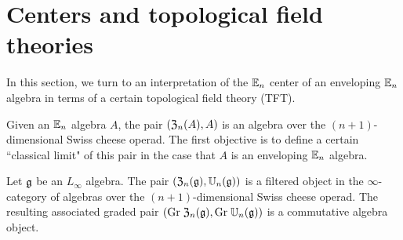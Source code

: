 \documentclass[11pt]{amsart}
\numberwithin{equation}{section}
\begin{document}
\section{Centers and topological field theories}
\label{sec: TFT}
%
%
%
%

In this section, we turn to an interpretation of the $\mathbb E_n$ center of an enveloping $\mathbb E_n$ algebra in terms of a certain topological field theory (TFT).

Given an $\mathbb E_n$ algebra $A$, the pair $(\mathfrak Z_n (A) , A)$ is an algebra over the $(n+1)$-dimensional Swiss cheese operad. 
The first objective is to define a certain ``classical limit" of this pair in the case that $A$ is an enveloping $\mathbb E_n$ algebra. 

\begin{prp}
\label{prp:swiss1}
Let $\mathfrak g$ be an $L_\infty$ algebra. 
The pair $(\mathfrak Z_n(\mathfrak g) , \mathbb U_n(\mathfrak g))$ is a filtered object in the $\infty$-category of algebras over the $(n+1)$-dimensional Swiss cheese operad. 
The resulting associated graded pair $({\rm Gr} \; \mathfrak Z_n(\mathfrak g) , {\rm Gr} \; \mathbb U_n(\mathfrak g))$ is a commutative algebra object.
\end{prp}
\end{document}
